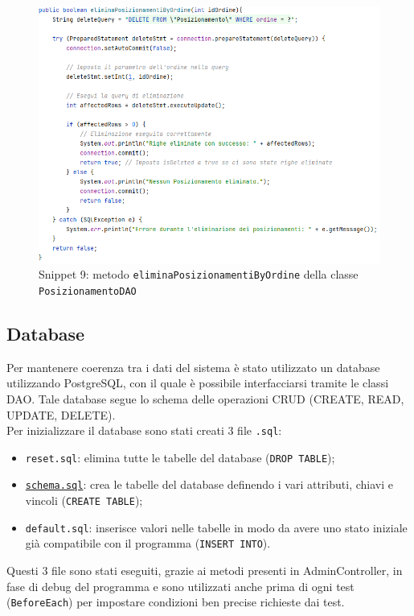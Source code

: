 \documentclass{article}
\newcommand{\code}[1]{\texttt{#1}}
\begin{document}
\begin{figure}[H]
    \centering
    \includegraphics[scale=0.5]{resources/images/Snippets/snippet_eliminaposizionamentibyordine.png}
    \captionsetup{labelformat=empty,labelsep=none}
    \caption{Snippet 9: metodo \code{eliminaPosizionamentiByOrdine} della classe \code{PosizionamentoDAO}}
    \label{fig:snippet_eliminaposizionamentibyordine}
\end{figure}


\subsection{Database}
Per mantenere coerenza tra i dati del sistema è stato utilizzato un database utilizzando PostgreSQL, con il quale è possibile interfacciarsi tramite le classi DAO. Tale database segue lo schema delle operazioni CRUD (CREATE, READ, UPDATE, DELETE). \\
Per inizializzare il database sono stati creati 3 file \code{.sql}:
\begin{itemize}
    \item \code{reset.sql}: elimina tutte le tabelle del database (\code{DROP TABLE});
    \item \hyperref[fig:snippet_createtable]{\code{schema.sql}}: crea le tabelle del database definendo i vari attributi, chiavi e vincoli (\code{CREATE TABLE});
    \item \code{default.sql}: inserisce valori nelle tabelle in modo da avere uno stato iniziale già compatibile con il programma (\code{INSERT INTO}).
\end{itemize}
Questi 3 file sono stati eseguiti, grazie ai metodi presenti in AdminController, in fase di debug del programma e sono utilizzati anche prima di ogni test (\code{BeforeEach}) per impostare condizioni ben precise richieste dai test.
\end{document}
